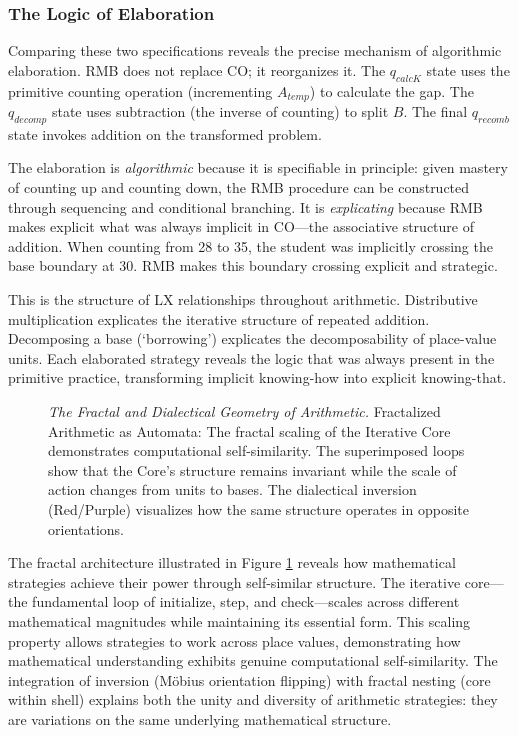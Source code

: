 \documentclass[12pt]{book}
\begin{document}
\subsubsection*{The Logic of Elaboration}

Comparing these two specifications reveals the precise mechanism of algorithmic elaboration. RMB does not replace CO; it reorganizes it. The $q_{calcK}$ state uses the primitive counting operation (incrementing $A_{temp}$) to calculate the gap. The $q_{decomp}$ state uses subtraction (the inverse of counting) to split $B$. The final $q_{recomb}$ state invokes addition on the transformed problem.

The elaboration is \textit{algorithmic} because it is specifiable in principle: given mastery of counting up and counting down, the RMB procedure can be constructed through sequencing and conditional branching. It is \textit{explicating} because RMB makes explicit what was always implicit in CO---the associative structure of addition. When counting from 28 to 35, the student was implicitly crossing the base boundary at 30. RMB makes this boundary crossing explicit and strategic.

This is the structure of LX relationships throughout arithmetic. Distributive multiplication explicates the iterative structure of repeated addition. Decomposing a base (`borrowing') explicates the decomposability of place-value units. Each elaborated strategy reveals the logic that was always present in the primitive practice, transforming implicit knowing-how into explicit knowing-that.

\begin{figure}[H]
\centering
\caption{\textit{The Fractal and Dialectical Geometry of Arithmetic.} Fractalized Arithmetic as Automata: The fractal scaling of the Iterative Core demonstrates computational self-similarity. The superimposed loops show that the Core's structure remains invariant while the scale of action changes from units to bases. The dialectical inversion (Red/Purple) visualizes how the same structure operates in opposite orientations.}
\label{fig:fractal-automata-arithmetic}
\end{figure}

The fractal architecture illustrated in Figure \ref{fig:fractal-automata-arithmetic} reveals how mathematical strategies achieve their power through self-similar structure. The iterative core---the fundamental loop of initialize, step, and check---scales across different mathematical magnitudes while maintaining its essential form. This scaling property allows strategies to work across place values, demonstrating how mathematical understanding exhibits genuine computational self-similarity. The integration of inversion (Möbius orientation flipping) with fractal nesting (core within shell) explains both the unity and diversity of arithmetic strategies: they are variations on the same underlying mathematical structure.
\end{document}
